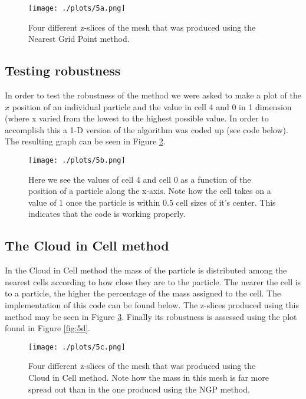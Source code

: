\documentclass[a4paper,10pt]{article}
\begin{document}
\begin{figure}[h!]
  \centering
  \texttt{[image: ./plots/5a.png]}
  \caption{Four different z-slices of the mesh that was produced using the Nearest Grid Point method.}
  \label{fig:5a}
\end{figure}

\subsection{Testing robustness}

In order to test the robustness of the method we were asked to make a plot of the $x$ position of an individual particle and the value in cell 4 and 0 in 1 dimension (where x varied from the lowest to the highest possible value. In order to accomplish this a 1-D version of the algorithm was coded up (see code below). The resulting graph can be seen in Figure \ref{fig:5b}. 

\begin{figure}[h!]
  \centering
  \texttt{[image: ./plots/5b.png]}
  \caption{Here we see the values of cell 4 and cell 0 as a function of the position of a particle along the x-axis. Note how the cell takes on a value of 1 once the particle is within 0.5 cell sizes of it's center. This indicates that the code is working properly.}
  \label{fig:5b}
\end{figure}

\subsection{The Cloud in Cell method}

In the Cloud in Cell method the mass of the particle is distributed among the nearest cells according to how close they are to the particle. The nearer the cell is to a particle, the higher the percentage of the mass assigned to the cell. The implementation of this code can be found below. The z-slices produced using this method may be seen in Figure \ref{fig:5c}. Finally its robustness is assessed using the plot found in Figure \ref{fig:5d}. 

\begin{figure}[h!]
  \centering
  \texttt{[image: ./plots/5c.png]}
  \caption{Four different z-slices of the mesh that was produced using the Cloud in Cell method. Note how the mass in this mesh is far more spread out than in the one produced using the NGP method.}
  \label{fig:5c}
\end{figure}
\end{document}
